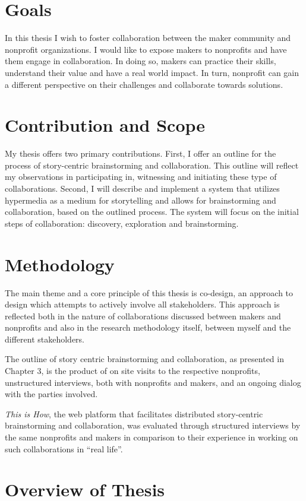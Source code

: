 \section{Goals}
In this thesis I wish to foster collaboration between the maker community and nonprofit organizations. I would like to expose makers to nonprofits and have them engage in collaboration. In doing so, makers can practice their skills, understand their value and have a real world impact. In turn, nonprofit can gain a different perspective on their challenges and collaborate towards solutions. 

\section{Contribution and Scope}
My thesis offers two primary contributions. First, I offer an outline for the process of story-centric brainstorming and collaboration. This outline will reflect my observations in participating in, witnessing and initiating these type of collaborations. Second, I will describe and implement a system that utilizes hypermedia as a medium for storytelling and allows for brainstorming and collaboration, based on the outlined process. The system will focus on the initial steps of collaboration: discovery, exploration and brainstorming. 

\section{Methodology} 
The main theme and a core principle of this thesis is co-design, an approach to design which attempts to actively involve all stakeholders. This approach is reflected both in the nature of collaborations discussed between makers and nonprofits and also in the research methodology itself, between myself and the different stakeholders. 

The outline of story centric brainstorming and collaboration, as presented in Chapter 3, is the product of on site visits to the respective nonprofits, unstructured interviews, both with nonprofits and makers, and an ongoing dialog with the parties involved. 

\textit{This is How}, the web platform that facilitates distributed story-centric brainstorming and collaboration, was evaluated through structured interviews by the same nonprofits and makers in comparison to their experience in working on such collaborations in ``real life''. 

\section{Overview of Thesis}

